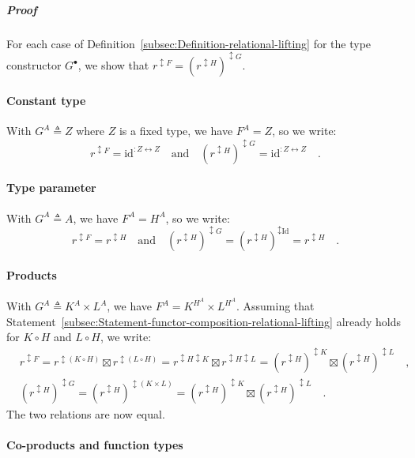 \subparagraph{Proof}

For each case of Definition~\ref{subsec:Definition-relational-lifting}
for the type constructor $G^{\bullet}$, we show that $r^{\updownarrow F}=(r^{\updownarrow H})^{\updownarrow G}$.

\paragraph{Constant type}

With $G^{A}\triangleq Z$ where $Z$ is a fixed type, we have $F^{A}=Z$,
so we write:
\[
r^{\updownarrow F}=\text{id}^{:Z\leftrightarrow Z}\quad\text{and}\quad(r^{\updownarrow H})^{\updownarrow G}=\text{id}^{:Z\leftrightarrow Z}\quad.
\]


\paragraph{Type parameter}

With $G^{A}\triangleq A$, we have $F^{A}=H^{A}$, so we write:
\[
r^{\updownarrow F}=r^{\updownarrow H}\quad\text{and}\quad(r^{\updownarrow H})^{\updownarrow G}=(r^{\updownarrow H})^{\updownarrow\text{Id}}=r^{\updownarrow H}\quad.
\]


\paragraph{Products}

With $G^{A}\triangleq K^{A}\times L^{A}$, we have $F^{A}=K^{H^{A}}\times L^{H^{A}}$.
Assuming that Statement~\ref{subsec:Statement-functor-composition-relational-lifting}
already holds for $K\circ H$ and $L\circ H$, we write:
\begin{align*}
 & r^{\updownarrow F}=r^{\updownarrow(K\circ H)}\boxtimes r^{\updownarrow(L\circ H)}=r^{\updownarrow H\updownarrow K}\boxtimes r^{\updownarrow H\updownarrow L}=(r^{\updownarrow H})^{\updownarrow K}\boxtimes(r^{\updownarrow H})^{\updownarrow L}\quad,\\
 & (r^{\updownarrow H})^{\updownarrow G}=(r^{\updownarrow H})^{\updownarrow(K\times L)}=(r^{\updownarrow H})^{\updownarrow K}\boxtimes(r^{\updownarrow H})^{\updownarrow L}\quad.
\end{align*}
The two relations are now equal.

\paragraph{Co-products and function types}

